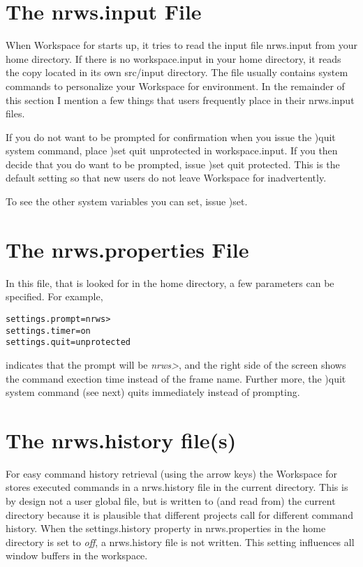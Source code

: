\section{The nrws.input File}

When Workspace for \nr{} starts up, it tries to read the input file nrws.input from your home directory. If there is no workspace.input in your home directory, it reads the copy located in its own src/input directory. The file usually contains system commands to personalize your Workspace for \nr{} environment. In the remainder of this section I mention a few things that users frequently place in their nrws.input files.

If you do not want to be prompted for confirmation when you issue the )quit system command, place )set quit unprotected in workspace.input. If you then decide that you do want to be prompted, issue )set quit protected. This is the default setting so that new users do not leave Workspace for \nr{} inadvertently.

To see the other system variables you can set, issue )set.


\section{The nrws.properties File}

In this file, that is looked for in the home directory, a few
parameters can be specified. For example,
\begin{verbatim}
settings.prompt=nrws>
settings.timer=on
settings.quit=unprotected
\end{verbatim}
indicates that the prompt will be \emph{nrws>}, and the right side of
the screen shows the command exection time instead of the frame
name. Further more, the )quit system command (see next) quits
immediately instead of prompting.

\section{The nrws.history file(s)}

For easy command history retrieval (using the arrow keys) the
Workspace for \nr{} stores executed commands in a nrws.history file
in the current directory. This is by design not a user global file,
but is written to (and read from) the current directory because it is
plausible that different projects call for different command
history. When the settings.history property in nrws.properties in the
home directory is set to \emph{off}, a nrws.history file is not
written. This setting influences all window buffers in the workspace.

